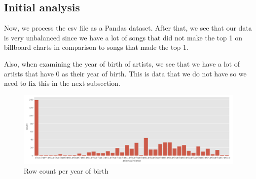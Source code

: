 \documentclass[10pt]{article}
\begin{document}
\newpage
\subsection{Initial analysis}
Now, we process the csv file as a Pandas dataset. After that, we see that our data is very unbalanced since we have a lot of songs that did not make the top 1 on billboard charts in comparison to songs that made the top 1. \par
Also, when examining the year of birth of artists, we see that we have a lot of artists that have 0 as their year of birth. This is data that we do not have so we need to fix this in the next subsection.
\begin{figure}[h]
    \centering
    \includegraphics[width=130mm]{year_vs_count.png}
    \caption{Row count per year of birth}
\end{figure}
\end{document}
